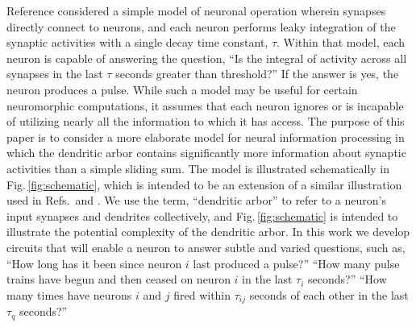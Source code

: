 \documentclass[twocolumn]{article}
\begin{document}
\begin{figure} 
\end{figure}
Reference \cite{sh2018} considered a simple model of neuronal operation wherein synapses directly connect to neurons, and each neuron performs leaky integration of the synaptic activities with a single decay time constant, $\tau$. Within that model, each neuron is capable of answering the question, ``Is the integral of activity across all synapses in the last $\tau$ seconds greater than threshold?'' If the answer is yes, the neuron produces a pulse. While such a model may be useful for certain neuromorphic computations, it assumes that each neuron ignores or is incapable of utilizing nearly all the information to which it has access. The purpose of this paper is to consider a more elaborate model for neural information processing in which the dendritic arbor contains significantly more information about synaptic activities than a simple sliding sum. The model is illustrated schematically in Fig.\,\ref{fig:schematic}, which is intended to be an extension of a similar illustration used in Refs.\,\cite{sh2018} and \cite{sh2018_full}. We use the term, ``dendritic arbor'' to refer to a neuron's input synapses and dendrites collectively, and Fig.\,\ref{fig:schematic} is intended to illustrate the potential complexity of the dendritic arbor. In this work we develop circuits that will enable a neuron to answer subtle and varied questions, such as, ``How long has it been since neuron $i$ last produced a pulse?'' ``How many pulse trains have begun and then ceased on neuron $i$ in the last $\tau_i$ seconds?'' ``How many times have neurons $i$ and $j$ fired within $\tau_{ij}$ seconds of each other in the last $\tau_q$ seconds?''
\end{document}
